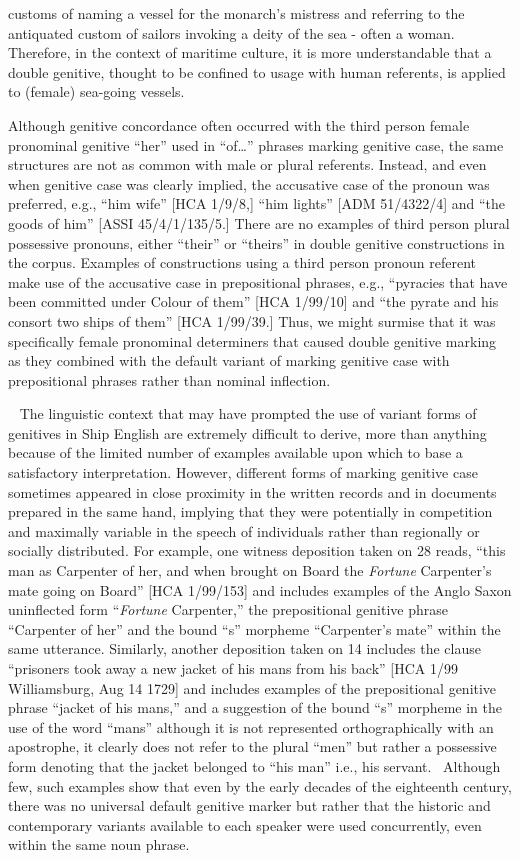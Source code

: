 customs of naming a vessel for the monarch’s mistress and referring to the antiquated custom of sailors invoking a deity of the sea - often a woman. Therefore, in the context of maritime culture, it is more understandable that a double genitive, thought to be confined to usage with human referents, is applied to (female) sea-going vessels. 

  Although genitive concordance often occurred with the third person female pronominal genitive “her” used in “of…” phrases marking genitive case, the same structures are not as common with male or plural referents. Instead, and even when genitive case was clearly implied, the accusative case of the pronoun was preferred, e.g., “him wife” [HCA 1/9/8,] “him lights” [ADM 51/4322/4] and “the goods of him” [ASSI 45/4/1/135/5.] There are no examples of third person plural possessive pronouns, either “their” or “theirs” in double genitive constructions in the corpus. Examples of constructions using a third person pronoun referent make use of the accusative case in prepositional phrases, e.g., “pyracies that have been committed under Colour of them” [HCA 1/99/10] and “the pyrate and his consort two ships of them” [HCA 1/99/39.] Thus, we might surmise that it was specifically female pronominal determiners that caused double genitive marking as they combined with the default variant of marking genitive case with prepositional phrases rather than nominal inflection. 

~  The linguistic context that may have prompted the use of variant forms of genitives in Ship English are extremely difficult to derive, more than anything because of the limited number of examples available upon which to base a satisfactory interpretation. However, different forms of marking genitive case sometimes appeared in close proximity in the written records and in documents prepared in the same hand, implying that they were potentially in competition and maximally variable in the speech of individuals rather than regionally or socially distributed. For example, one witness deposition taken on 28 \citealt{March1722} reads, “this man as Carpenter of her, and when brought on Board the \textit{Fortune} Carpenter’s mate going on Board” [HCA 1/99/153] and includes examples of the Anglo Saxon uninflected form “\textit{Fortune} Carpenter,” the prepositional genitive phrase “Carpenter of her” and the bound “s” morpheme “Carpenter’s mate” within the same utterance. Similarly, another deposition taken on 14 \citealt{August1729} includes the clause “prisoners took away a new jacket of his mans from his back” [HCA 1/99 Williamsburg, Aug 14 1729] and includes examples of the prepositional genitive phrase “jacket of his mans,” and a suggestion of the bound “s” morpheme in the use of the word “mans” although it is not represented orthographically with an apostrophe, it clearly does not refer to the plural “men” but rather a possessive form denoting that the jacket belonged to “his man” i.e., his servant. ~Although few, such examples show that even by the early decades of the eighteenth century, there was no universal default genitive marker but rather that the historic and contemporary variants available to each speaker were used concurrently, even within the same noun phrase. 

